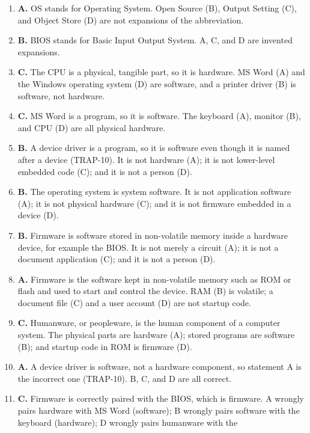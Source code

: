 \begin{enumerate}[label=\textbf{Q\arabic*.}, leftmargin=*]
\item \textbf{A.} OS stands for Operating System. Open Source (B), Output
  Setting (C), and Object Store (D) are not expansions of the abbreviation.
\item \textbf{B.} BIOS stands for Basic Input Output System. A, C, and D are
  invented expansions.
\item \textbf{C.} The CPU is a physical, tangible part, so it is hardware.
  MS Word (A) and the Windows operating system (D) are software, and a printer
  driver (B) is software, not hardware.
\item \textbf{C.} MS Word is a program, so it is software. The keyboard (A),
  monitor (B), and CPU (D) are all physical hardware.
\item \textbf{B.} A device driver is a program, so it is software even though
  it is named after a device (TRAP-10). It is not hardware (A); it is not
  lower-level embedded code (C); and it is not a person (D).
\item \textbf{B.} The operating system is system software. It is not
  application software (A); it is not physical hardware (C); and it is not
  firmware embedded in a device (D).
\item \textbf{B.} Firmware is software stored in non-volatile memory inside a
  hardware device, for example the BIOS. It is not merely a circuit (A); it is
  not a document application (C); and it is not a person (D).
\item \textbf{A.} Firmware is the software kept in non-volatile memory such as
  ROM or flash and used to start and control the device. RAM (B) is volatile;
  a document file (C) and a user account (D) are not startup code.
\item \textbf{C.} Humanware, or peopleware, is the human component of a
  computer system. The physical parts are hardware (A); stored programs are
  software (B); and startup code in ROM is firmware (D).
\item \textbf{A.} A device driver is software, not a hardware component, so
  statement A is the incorrect one (TRAP-10). B, C, and D are all correct.
\item \textbf{C.} Firmware is correctly paired with the BIOS, which is
  firmware. A wrongly pairs hardware with MS Word (software); B wrongly pairs
  software with the keyboard (hardware); D wrongly pairs humanware with the

\end{enumerate}
